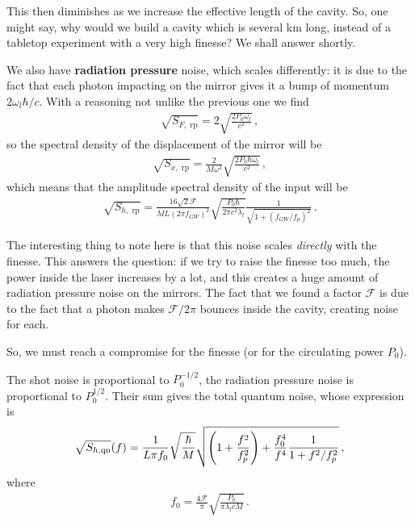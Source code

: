\documentclass[main.tex]{subfiles}
\begin{document}
This then diminishes as we increase the effective length of the cavity. 
So, one might say, why would we build a cavity which is several km long, instead of a tabletop experiment with a very high finesse? We shall answer shortly.

We also have \textbf{radiation pressure} noise, which scales differently: it is due to the fact that each photon impacting on the mirror gives it a bump of momentum \(2 \omega_{l} \hbar / c\). 
With a reasoning not unlike the previous one we find 
%
\begin{align}
\sqrt{S_{F, \text{ rp}}} = 2 \sqrt{\frac{2 P_0 \omega_{l}}{c^2}}
\,,
\end{align}
%
so the spectral density of the displacement of the mirror will be 
%
\begin{align}
\sqrt{S_{x, \text{ rp}}} = \frac{2}{M \omega^2} \sqrt{\frac{2 P_0 \hbar \omega_{l}}{c^2}} 
\,,
\end{align}
%
which means that the amplitude spectral density of the input will be 
%
\begin{align}
\sqrt{S_{h, \text{ rp}}} = \frac{16 \sqrt{2} \mathcal{F}}{ML (2 \pi f_{GW})^2} \sqrt{\frac{P_0 \hbar}{2 \pi c^2 \lambda_{l}}} \frac{1}{\sqrt{1 + (f_{GW} / f_{p})^2}}
\,.
\end{align}

The interesting thing to note here is that this noise scales \emph{directly} with the finesse. 
This answers the question: if we try to raise the finesse too much, the power inside the laser increases by a lot, and this creates a huge amount of radiation pressure noise on the mirrors. 
The fact that we found a factor \(\mathcal{F}\) is due to the fact that a photon makes \(\mathcal{F} / 2 \pi \) bounces inside the cavity, creating noise for each. 

So, we must reach a compromise for the finesse (or for the circulating power \(P_0 \)).

The shot noise is proportional to \(P_0^{-1/2}\), the radiation pressure noise is proportional to \(P_0^{1/2}\). 
Their sum gives the total quantum noise, whose expression is 
%
\begin{align}
\sqrt{S_{h, \text{qn}}} (f) = \frac{1}{L \pi f_0 }
\sqrt{\frac{\hbar}{M}}
\sqrt{\qty(1 + \frac{f^2}{f_p^2}) + \frac{f_0^{4}}{f^{4}} \frac{1}{1 + f^2 / f_p^2}}
\,,
\end{align}
%
where 
%
\begin{align}
f_0 = \frac{4 \mathcal{F}}{\pi } \sqrt{\frac{P_0 }{\pi \lambda_{l} cM}}
\,.
\end{align}
\end{document}
